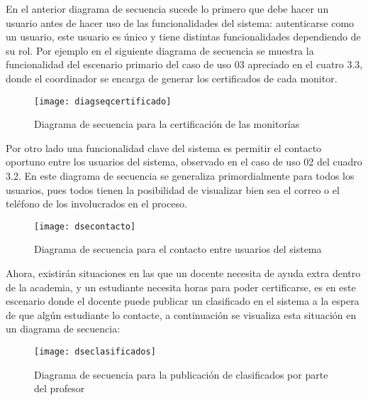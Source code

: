 En el anterior diagrama de secuencia sucede lo primero que debe hacer un usuario antes de hacer uso de las funcionalidades del sistema: autenticarse como un usuario, este usuario es único y tiene distintas funcionalidades dependiendo de su rol. 
\clearpage
Por ejemplo en el siguiente diagrama de secuencia se muestra la funcionalidad del escenario primario del caso de uso 03 apreciado en el cuatro 3.3, donde el coordinador se encarga de generar los certificados de cada monitor.

\begin{figure}[H]
	\centering
	\texttt{[image: diagseqcertificado]}
    \caption{Diagrama de secuencia para la certificación de las monitorías}
	\label{fig:dsecertificacion}
\end{figure}

Por otro lado una funcionalidad clave del sistema es permitir el contacto oportuno entre los usuarios del sistema, observado en el caso de uso 02 del cuadro 3.2. En este diagrama de secuencia se generaliza primordialmente para todos los usuarios, pues todos tienen la posibilidad de visualizar bien sea el correo o el teléfono de los involucrados en el proceso.
\begin{figure}[H]
	\centering
	\texttt{[image: dsecontacto]}
    \caption{Diagrama de secuencia para el contacto entre usuarios del sistema}
	\label{fig:dsecontacto}
\end{figure}

Ahora, existirán situaciones en las que un docente necesita de ayuda extra dentro de la academia, y un estudiante necesita horas para poder certificarse, es en este escenario donde el docente puede publicar un clasificado en el sistema a la espera de que algún estudiante lo contacte, a continuación se visualiza esta situación en un diagrama de secuencia: 
\begin{figure}[H]
	\centering
	\texttt{[image: dseclasificados]}
    \centering
    \caption{Diagrama de secuencia para la publicación de clasificados por parte del profesor}
	\label{fig:dseclasificados}
\end{figure}

